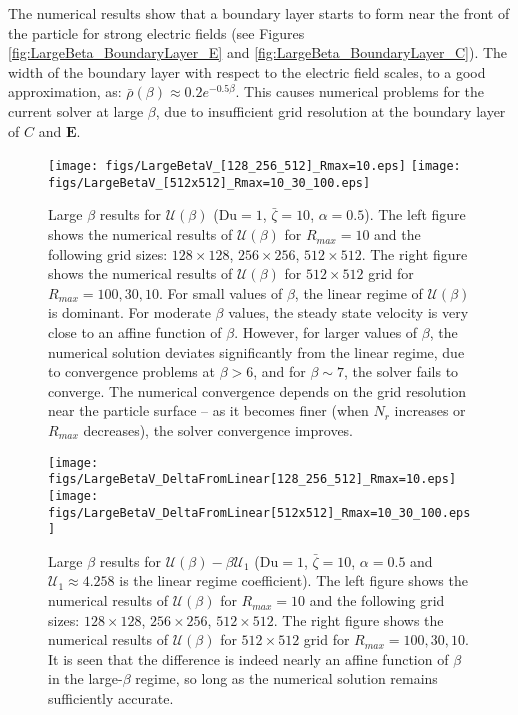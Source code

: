 \documentclass[MSc,beforeExam]{iitcsthesis}
\newcommand\bE{\boldsymbol{E}}
\newcommand\Du{\text{Du}}
\newcommand\cU{\mathscr{U}}
\begin{document}
The numerical results show that a boundary layer starts to form near the front 
of the particle for strong electric fields (see Figures \ref{fig:LargeBeta_BoundaryLayer_E}
and \ref{fig:LargeBeta_BoundaryLayer_C}).
The width of the boundary layer with respect to the electric field scales, to a good approximation, as: $\bar\rho(\beta) \approx 0.2 e^{-0.5 \beta}$.
This causes numerical problems for the current solver at large $\beta$, due to insufficient
grid resolution at the boundary layer of $C$ and $\bE$.

\begin{figure}
    \begin{center}
    \texttt{[image: figs/LargeBetaV\_[128\_256\_512]\_Rmax=10.eps]}
    \texttt{[image: figs/LargeBetaV\_[512x512]\_Rmax=10\_30\_100.eps]}
        \caption[Large $\beta$ results for $\cU$]
{Large $\beta$ results for $\cU(\beta)$ ($\Du = 1$, $\bar\zeta = 10$, $\alpha = 0.5$). 
The left figure shows the numerical results of $\cU(\beta)$ for $R_{max} = 10$ and the following grid sizes: $128 \times 128$, $256 \times 256$, $512 \times 512$. 
The right figure shows the numerical results of $\cU(\beta)$ for
$512 \times 512$ grid for $R_{max} = 100, 30, 10$. For small values of $\beta$, the linear
regime of $\cU(\beta)$ is dominant. 
For moderate $\beta$ values, the steady state velocity is very close to an affine function of $\beta$.
However, for larger values of $\beta$, the numerical solution
deviates significantly from the linear regime, due to convergence problems at $\beta > 6$, 
and for $\beta \sim 7$, the solver fails to converge. The numerical convergence 
depends on the grid resolution near the particle surface -- 
as it becomes finer (when $N_r$ increases or $R_{max}$ decreases), the solver convergence improves.}
	    \label{fig:LargeBetaV_grids}	    
    \end{center}
\end{figure}
\begin{figure}
    \begin{center}
    \texttt{[image: figs/LargeBetaV\_DeltaFromLinear[128\_256\_512]\_Rmax=10.eps]}
    \texttt{[image: figs/LargeBetaV\_DeltaFromLinear[512x512]\_Rmax=10\_30\_100.eps]}
        \caption[Large $\beta$ results for $\cU$ -- difference from linear regime]
{Large $\beta$ results for $\cU(\beta) - \beta\cU_1$ ($\Du = 1$, $\bar\zeta = 10$, $\alpha = 0.5$ and $\cU_1 \approx 4.258$ is the linear regime coefficient). 
The left figure shows the numerical results of $\cU(\beta)$ for $R_{max} = 10$ and the following grid sizes: $128 \times 128$, $256 \times 256$, $512 \times 512$. 
The right figure shows the numerical results of $\cU(\beta)$ for
$512 \times 512$ grid for $R_{max} = 100, 30, 10$.
It is seen that the difference is indeed nearly an affine function of $\beta$ in the large-$\beta$ regime, so long as the numerical solution remains sufficiently accurate.}
	    \label{fig:LargeBetaV_DeltaFromLinear_grids}	    
    \end{center}
\end{figure}
\end{document}
